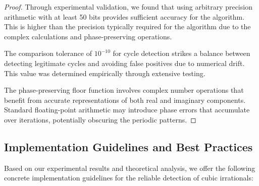 \begin{proof}
Through experimental validation, we found that using arbitrary precision arithmetic with at least 50 bits provides sufficient accuracy for the algorithm. This is higher than the precision typically required for the \HAPD{} algorithm due to the complex calculations and phase-preserving operations.

The comparison tolerance of $10^{-10}$ for cycle detection strikes a balance between detecting legitimate cycles and avoiding false positives due to numerical drift. This value was determined empirically through extensive testing.

The phase-preserving floor function involves complex number operations that benefit from accurate representations of both real and imaginary components. Standard floating-point arithmetic may introduce phase errors that accumulate over iterations, potentially obscuring the periodic patterns.
\end{proof}

\subsection{Implementation Guidelines and Best Practices}

Based on our experimental results and theoretical analysis, we offer the following concrete implementation guidelines for the reliable detection of cubic irrationals:

